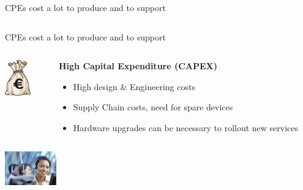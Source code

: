 \documentclass[a4paper]{beamer}
\begin{document}
\begin{frame}{CPEs cost a lot to produce and to support}
\begin{columns}[T]
\begin{column}[T]{0.75 \textwidth}
																																							
		\end{column}
																										
	\end{columns}
											
											
\end{frame}



\begin{frame}{CPEs cost a lot to produce and to support}
											
	\begin{columns}[T] 
		\begin{column}[T]{0.15 \textwidth} 
			\includegraphics[width=3em]{bagofmoney.jpg}
		\end{column}
																										
		\begin{column}[T]{0.75 \textwidth} %
																																							
																																								   
			\textbf{ High Capital Expenditure (CAPEX)}
			\begin{itemize}
				\item High design \& Engineering costs
				\item Supply Chain costs, need for spare devices
				\item Hardware upgrades can be necessary to rollout new services
			\end{itemize}
			\vspace{3em}				     
																																							
		\end{column}
																										
	\end{columns}
											
											
	\begin{columns}[T] 
		\begin{column}[T]{0.15 \textwidth} 
			\includegraphics[width=6em]{customer-care.jpg}
		\end{column}
																						

\end{columns}
\end{frame}
\end{document}
